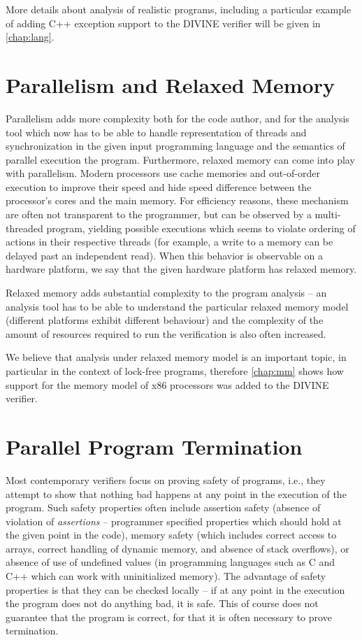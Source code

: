 More details about analysis of realistic programs, including a particular
example of adding C++ exception support to the DIVINE verifier will be given in
\autoref{chap:lang}.

\section{Parallelism and Relaxed Memory}

Parallelism adds more complexity both for the code author, and for the analysis tool which now has to be able to handle representation of threads and synchronization in the given input programming language and the semantics of parallel execution the program.
Furthermore, relaxed memory can come into play with parallelism.
Modern processors use cache memories and out-of-order execution to improve their speed and hide speed difference between the processor's cores and the main memory.
For efficiency reasons, these mechanism are often not transparent to the programmer, but can be observed by a multi-threaded program, yielding possible executions which seems to violate ordering of actions in their respective threads (for example, a write to a memory can be delayed past an independent read).
When this behavior is observable on a hardware platform, we say that the given hardware platform has relaxed memory.

Relaxed memory adds substantial complexity to the program analysis --
an analysis tool has to be able to understand the particular relaxed memory model (different platforms exhibit different behaviour) and the complexity of the amount of resources required to run the verification is also often increased.

We believe that analysis under relaxed memory model is an important topic,
in particular in the context of lock-free programs, therefore \autoref{chap:mm}
shows how support for the memory model of x86 processors was added to the
DIVINE verifier.

\section{Parallel Program Termination}

Most contemporary verifiers focus on proving safety of programs, i.e., they
attempt to show that nothing bad happens at any point in the execution of the
program.
Such safety properties often include assertion safety (absence of violation of \emph{assertions} -- programmer specified properties which should hold at the given point in the code), memory safety (which includes correct access to arrays, correct handling of dynamic memory, and absence of stack overflows), or absence of use of undefined values (in programming languages such as C and C++ which can work with uninitialized memory).
The advantage of safety properties is that they can be checked locally -- if at
any point in the execution the program does not do anything bad, it is safe.
This of course does not guarantee that the program is correct, for that it is often necessary to prove termination.

